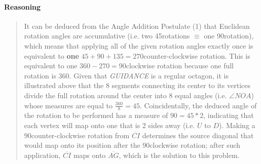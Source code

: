 \documentclass[letterpaper,12pt,twoside]{report}
\begin{document}
	\paragraph{Reasoning}
	\begin{quotation}
	
	It can be deduced from the Angle Addition Postulate (1) that Euclidean rotation angles are accumulative (i.e. two 45\textdegree \space rotations $\equiv$ one 90\textdegree \space rotation), which means that applying all of the given rotation angles exactly once is equivalent to \textbf{one} $45+90+135=270$\textdegree \space counter-clockwise rotation. This is equivalent to one $360-270=90$\textdegree \space clockwise rotation because one full rotation is $360$\textdegree. Given that \textit{GUIDANCE} is a regular octagon, it is illustrated above that the 8 segments connecting its center to its vertices divide the full rotation around the center into 8 equal angles (i.e. $\angle NOA$) whose measures are equal to $\frac{360}{8}=45$\textdegree. Coincidentally, the deduced angle of the rotation to be performed has a measure of $90=45*2$, indicating that each vertex will map onto one that is 2 sides away (i.e. $U$ to $D$). Making a $90$\textdegree \space counter-clockwise rotation from $\overline{CI}$ determines the source diagonal that would map onto its position after the $90$\textdegree \space clockwise rotation; after such application, $\overline{CI}$ maps onto $\boxed{\overline{AG}}$, which is the solution to this problem.
	
	\end{quotation}
	
	\iffalse
	
	\paragraph{External References}
	
	\begin{enumerate}
		\item Textbook Ch. 9, Pg. 589: Area of Parallelograms
		\item Textbook Ch. 9, Pg. 590: Area of Triangles and Trapezoids
	\end{enumerate}
	\fi
\end{document}
